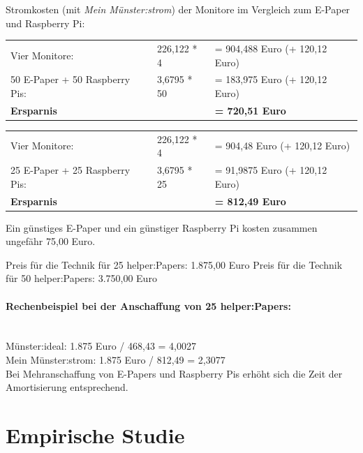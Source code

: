 \documentclass[10pt]{article}
\begin{document}
\noindent
Stromkosten (mit \textit{Mein Münster:strom}) der Monitore im Vergleich zum E-Paper und Raspberry Pi: \newline
\begin{tabular}{lll}
  Vier Monitore:   & 226,122 * 4 & = 904,488 Euro (+ 120,12 Euro)\\
    50 E-Paper + 50 Raspberry Pis: & 3,6795 * 50 & = 183,975 Euro (+ 120,12 Euro)\\  \hline
   \textbf{Ersparnis} & & \textbf{= 720,51 Euro}
\end{tabular}
\newline

\noindent
\begin{tabular}{lll}
  Vier Monitore:   & 226,122 * 4 & = 904,48 Euro (+ 120,12 Euro) \\
    25 E-Paper + 25 Raspberry Pis: & 3,6795 * 25 & = 91,9875 Euro (+ 120,12 Euro)\\  \hline
    \textbf{Ersparnis} & & \textbf{= 812,49 Euro}
\end{tabular}
\newline

\noindent
Ein günstiges E-Paper \cite{günstiges_E-Paper} und ein günstiger Raspberry Pi \cite{günstiger_RaspberryPi} kosten zusammen ungefähr 75,00 Euro.
\newline

\noindent
Preis für die Technik für 25 helper:Papers: 1.875,00 Euro
\newline
Preis für die Technik für 50 helper:Papers: 3.750,00 Euro

\paragraph{Rechenbeispiel bei der Anschaffung von 25 helper:Papers:} \mbox{}\vspace{2 ex}\\
Münster:ideal:
1.875 Euro / 468,43 = 4,0027 \\
Mein Münster:strom: 1.875 Euro / 812,49 = 2,3077 \mbox{}\vspace{2 ex}\\
Bei Mehranschaffung von E-Papers und Raspberry Pis erhöht sich die Zeit der Amortisierung entsprechend.

\section{Empirische Studie}
\end{document}

